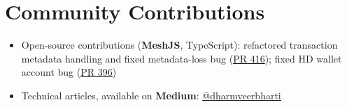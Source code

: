 \documentclass[]{resume-openfont}
\newcommand{\weblink}[2]{\href{#2}{\underline{#1}}}
\begin{document}
\section{Community Contributions}

\begin{itemize}
    \item Open-source contributions (\textbf{MeshJS}, TypeScript): refactored transaction metadata handling and fixed metadata-loss bug (\weblink{PR 416}{https://github.com/MeshJS/mesh/pull/416}); fixed HD wallet account bug (\weblink{PR 396}{https://github.com/MeshJS/mesh/pull/396})
    \item Technical articles, available on \textbf{Medium}: \weblink{@dharmveerbharti}{https://medium.com/@dharmveerbharti}

\end{itemize}
\end{document}
